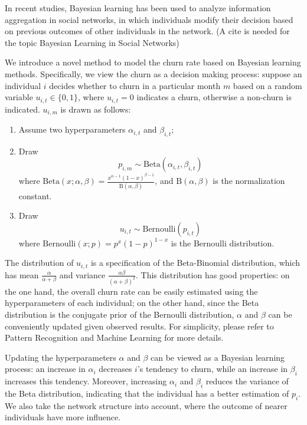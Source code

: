 \documentclass[tcn = 37075, sheet = true, abstract = true]{mcmthesis}
\begin{document}
In recent studies, Bayesian learning has been used to analyze information aggregation in social networks, in which individuals modify their decision based on previous outcomes of other individuals in the network. (A cite is needed for the topic Bayesian Learning in Social Networks)

We introduce a novel method to model the churn rate based on Bayesian learning methods. Specifically, we view the churn as a decision making process: suppose an individual $i$ decides whether to churn in a particular month $m$ based on a random variable $u_{i,t} \in \{0, 1\}$, where $u_{i,t} = 0$ indicates a churn, otherwise a non-churn is indicated. $u_{i, m}$ is drawn as follows:
\begin{enumerate}
\item Assume two hyperparameters $\alpha_{i, t}$ and $\beta_{i, t}$;
\item Draw 
  \begin{equation}
   p_{i, m} \sim \mathrm{Beta}(\alpha_{i, t}, \beta_{i, t})
   \label{eq:beta}
  \end{equation}
  where $\displaystyle \mathrm{Beta}(x; \alpha, \beta) = \frac{x^{\alpha - 1}(1-x)^{\beta - 1}}{\mathrm{B}(\alpha, \beta)}$, and $\mathrm{B}(\alpha, \beta)$ is the normalization constant.
\item Draw 
  \begin{equation}
	u_{i, t} \sim \mathrm{Bernoulli}(p_{i, t})
    \label{eq:bernoulli}
  \end{equation}
  where $\mathrm{Bernoulli}(x; p) = p^x(1-p)^{1-x}$ is the Bernoulli distribution.
\end{enumerate}

The distribution of $u_{i, t}$ is a specification of the Beta-Binomial distribution, which has mean $\displaystyle \frac{\alpha}{\alpha + \beta}$ and variance $\displaystyle\frac{\alpha\beta}{(\alpha+\beta)^2}$. This distribution has good properties: on the one hand, the overall churn rate can be easily estimated using the hyperparameters of each individual; on the other hand, since the Beta distribution is the conjugate prior of the Bernoulli distribution, $\alpha$ and $\beta$ can be conveniently updated given observed results. For simplicity, please refer to Pattern Recognition and Machine Learning for more details.

Updating the hyperparameters $\alpha$ and $\beta$ can be viewed as a Bayesian learning process: an increase in $\alpha_i$ decreases $i$'s tendency to churn, while an increase in $\beta_i$ increases this tendency. Moreover, increasing $\alpha_i$ and $\beta_i$ reduces the variance of the Beta distribution, indicating that the individual has a better estimation of $p_i$. We also take the network structure into account, where the outcome of nearer individuals have more influence.
\end{document}
